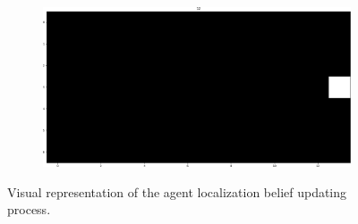 \documentclass[runningheads]{llncs}
\begin{document}
\begin{figure}
	\begin{subfigure}[b]{0.32\textwidth}
		\centering
		\includegraphics[width=\textwidth]{imgs/prediction_default_lab/it_12.png}
		\caption{}
		\label{fig:localization_step12}
	\end{subfigure}
	\caption{Visual representation of the agent localization belief updating process.}
	\label{fig:localization_example}
\end{figure}
\FloatBarrier





%
%
%


%
\end{document}
